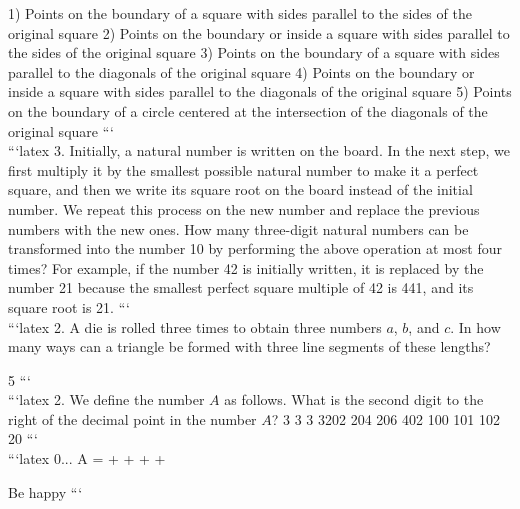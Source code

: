 1) Points on the boundary of a square with sides parallel to the sides of the original square  
2) Points on the boundary or inside a square with sides parallel to the sides of the original square  
3) Points on the boundary of a square with sides parallel to the diagonals of the original square  
4) Points on the boundary or inside a square with sides parallel to the diagonals of the original square  
5) Points on the boundary of a circle centered at the intersection of the diagonals of the original square  
```
\\
```latex
3. Initially, a natural number is written on the board. In the next step, we first multiply it by the smallest possible natural number to make it a perfect square, and then we write its square root on the board instead of the initial number. We repeat this process on the new number and replace the previous numbers with the new ones. How many three-digit natural numbers can be transformed into the number 10 by performing the above operation at most four times? For example, if the number 42 is initially written, it is replaced by the number 21 because the smallest perfect square multiple of 42 is 441, and its square root is 21.
```
\\
```latex
2. A die is rolled three times to obtain three numbers \(a\), \(b\), and \(c\). In how many ways can a triangle be formed with three line segments of these lengths?

5
```
\\
```latex
2. We define the number $A$ as follows. What is the second digit to the right of the decimal point in the number $A$?  
3 3 3 3202 204 206 402  
100 101 102 20
```
\\
```latex
0... A = + + + + 

Be happy
```
\\
